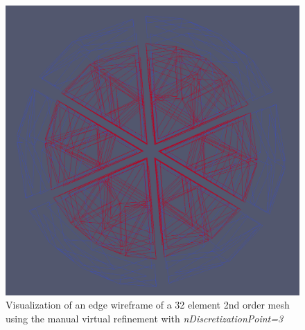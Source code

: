 \begin{figure}
	\centering
	\includegraphics[scale=0.2]{images/gmshreader-vtk-wireframe}
	\caption{Visualization of an edge wireframe of a 32 element 2nd order mesh using the manual virtual refinement with  \textit{nDiscretizationPoint=3}  }
	\label{fig:gmshreader:wireframe}
\end{figure}


